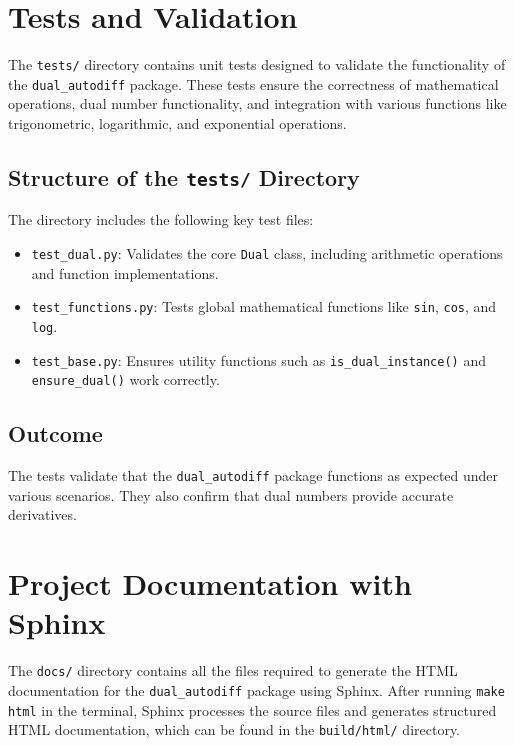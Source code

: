 \documentclass[a4paper,12pt]{article}
\begin{document}
\section{Tests and Validation}

The \texttt{tests/} directory contains unit tests designed to validate the functionality of the \texttt{dual\_autodiff} package. These tests ensure the correctness of mathematical operations, dual number functionality, and integration with various functions like trigonometric, logarithmic, and exponential operations.

\subsection{Structure of the \texttt{tests/} Directory}
The directory includes the following key test files:
\begin{itemize}
    \item \texttt{test\_dual.py}: Validates the core \texttt{Dual} class, including arithmetic operations and function implementations.
    \item \texttt{test\_functions.py}: Tests global mathematical functions like \texttt{sin}, \texttt{cos}, and \texttt{log}.
    \item \texttt{test\_base.py}: Ensures utility functions such as \texttt{is\_dual\_instance()} and \texttt{ensure\_dual()} work correctly.
\end{itemize}

\subsection{Outcome}
The tests validate that the \texttt{dual\_autodiff} package functions as expected under various scenarios. They also confirm that dual numbers provide accurate derivatives.

\section{Project Documentation with Sphinx}

The \texttt{docs/} directory contains all the files required to generate the HTML documentation for the \texttt{dual\_autodiff} package using Sphinx. After running \texttt{make html} in the terminal, Sphinx processes the source files and generates structured HTML documentation, which can be found in the \texttt{build/html/} directory.
\end{document}

